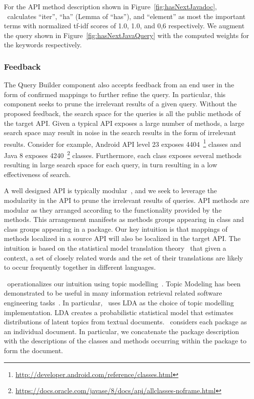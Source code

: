 For the API method description  shown in Figure~\ref{fig:hasNextJavadoc}, \tool\ calculates ``iter'', ``ha'' (Lemma of ``has''), and ``element'' as most the important terms with normalized tf-idf scores of 1.0, 1.0, and 0,6 respectively. We augment the query shown in Figure~\ref{fig:hasNextJavaQuery} with the computed weights for the keywords respectively.

\subsubsection{Feedback}
\label{subsub:querybuilder:feedback}


The Query Builder component also accepts feedback from an end user in the form of confirmed mappings to further refine the query.
In particular, this component seeks to prune the irrelevant results of a given query.
Without the proposed feedback, the search space for the queries is all the public methods of the target API.
Given a typical API exposes a large number of methods, a large search space may result in noise in the search results in the form of irrelevant results.
Consider for example, Android API level 23 exposes 4404~\footnote{\url{http://developer.android.com/reference/classes.html}} classes
and Java 8 exposes 4240~\footnote{\url{https://docs.oracle.com/javase/8/docs/api/allclasses-noframe.html}} classes.
Furthermore, each class exposes several methods resulting in large search space for each query, in turn resulting in a low effectiveness of search.

A well designed API is typically modular~\cite{Bloch:2006:OOPSLA:APIDesign}, and
we seek to leverage the modularity in the API to prune the irrelevant results of queries.
API methods are modular as they arranged according to the functionality provided by the methods.
This arrangement manifests as methods groups appearing in class and class groups appearing in a package.
Our key intuition is that mappings of methods localized in a source API will also be localized in the target API.
The intuition is based on the statistical model translation theory~\cite{brown1993mathematics} that given a context, a set of closely related words and the set of their translations are likely to occur frequently together in different languages. 


\tool\ operationalizes our intuition using topic modelling~\cite{blei2003latent,panichella2013effectively}.
Topic Modeling has been demonstrated to be useful in many information retrieval related software engineering tasks~\cite{Panichella2013:ICSE:TopicModel,Binkley:2014:ULS:2597008.2597150}.
In particular, \tool\ uses LDA as the choice of topic modelling implementation. 
LDA creates a probabilistic statistical model that estimates distributions of latent topics from textual documents.
\tool\ considers each package as an individual document. 
In particular, we concatenate the package description with the descriptions of the classes and methods occurring within the package to form the document.

